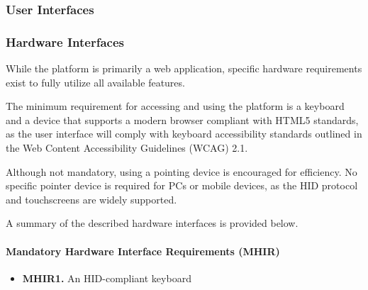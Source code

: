 \subsubsection{User Interfaces}
\subsubsection{Hardware Interfaces}
While the platform is primarily a web application, specific hardware requirements exist to fully utilize all available features.

The minimum requirement for accessing and using the platform is a keyboard and a device that supports a modern browser compliant with HTML5 standards, as the user interface will comply with keyboard accessibility standards outlined in the Web Content Accessibility Guidelines (WCAG) 2.1.

Although not mandatory, using a pointing device is encouraged for efficiency. No specific pointer device is required for PCs or mobile devices, as the HID protocol and touchscreens are widely supported.




A summary of the described hardware interfaces is provided below.

\paragraph{Mandatory Hardware Interface Requirements (MHIR)}
\begin{itemize}
    \item \textbf{MHIR1.} An HID-compliant keyboard
\end{itemize}

